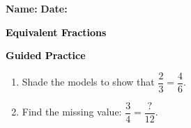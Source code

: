 \documentclass[12pt, letterpaper, fleqn]{article}
\begin{document}
\textbf{Name:} \underline{\hspace{5cm}}
\hfill
\textbf{Date:} \underline{\hspace{3cm}}\\

\begin{tcolorbox}[colback=customteal!20]
    \large\textcolor{black}{\textbf{Equivalent Fractions}}
\end{tcolorbox}
\newpage
\begin{tcolorbox}[colback=customteal!20]
    \large\textcolor{black}{\textbf{Guided Practice}}
\end{tcolorbox}
\begin{enumerate}[itemsep=3.5cm, leftmargin=0.6cm]
\item Shade the models to show that $\dfrac{2}{3} = \dfrac{4}{6}$.
\vspace{3cm}
\item Find the missing value: $\dfrac{3}{4} = \dfrac{\text{?}}{12}$.
\end{enumerate}
\end{document}
